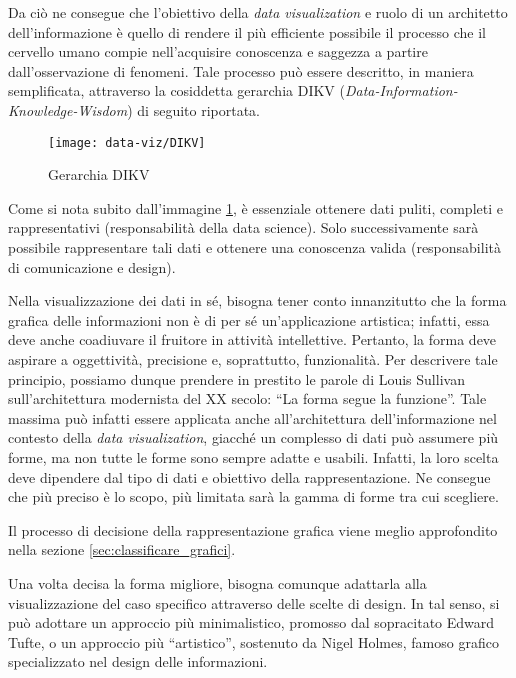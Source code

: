 Da ciò ne consegue che l'obiettivo della \emph{data visualization} e ruolo di un architetto dell'informazione è quello di rendere il più efficiente possibile il processo che il cervello
umano compie nell'acquisire conoscenza e saggezza a partire dall'osservazione di fenomeni.
Tale processo può essere descritto, in maniera semplificata, attraverso la cosiddetta gerarchia DIKV (\emph{Data-Information-Knowledge-Wisdom}) di seguito riportata.
\begin{figure}[!h] 
    \centering 
    \texttt{[image: data-viz/DIKV]} 
    \caption{Gerarchia DIKV}
    \label{fig:DIKV}
\end{figure}

Come si nota subito dall'immagine \ref{fig:DIKV}, è essenziale ottenere dati puliti, completi e rappresentativi (responsabilità della data science). Solo successivamente sarà possibile rappresentare tali dati e 
ottenere una conoscenza valida (responsabilità di comunicazione e design).

\bigskip
\noindent Nella visualizzazione dei dati in sé, bisogna tener conto innanzitutto che la forma grafica delle informazioni non è di per sé un'applicazione artistica; infatti, 
essa deve anche coadiuvare il fruitore in attività intellettive. Pertanto, la forma deve aspirare a oggettività, precisione e, soprattutto, funzionalità.
Per descrivere tale principio, possiamo dunque prendere in prestito le parole di Louis Sullivan sull'architettura modernista del XX secolo: ``La forma segue la funzione''. 
Tale massima può infatti essere applicata anche all'architettura dell'informazione nel contesto della \emph{data visualization}, giacché
un complesso di dati può assumere più forme, ma non tutte le forme sono sempre adatte e usabili. Infatti, la loro scelta deve dipendere dal
tipo di dati e obiettivo della rappresentazione. Ne consegue che più preciso è lo scopo, più limitata sarà la gamma di forme tra cui scegliere.

Il processo di decisione della rappresentazione grafica viene meglio approfondito nella sezione \ref{sec:classificare_grafici}.

\bigskip
\noindent Una volta decisa la forma migliore, bisogna comunque adattarla alla visualizzazione del caso specifico attraverso delle scelte di design.
In tal senso, si può adottare un approccio più minimalistico, promosso dal sopracitato Edward Tufte, o un approccio più ``artistico'', 
sostenuto da Nigel Holmes, famoso grafico specializzato nel design delle informazioni.

